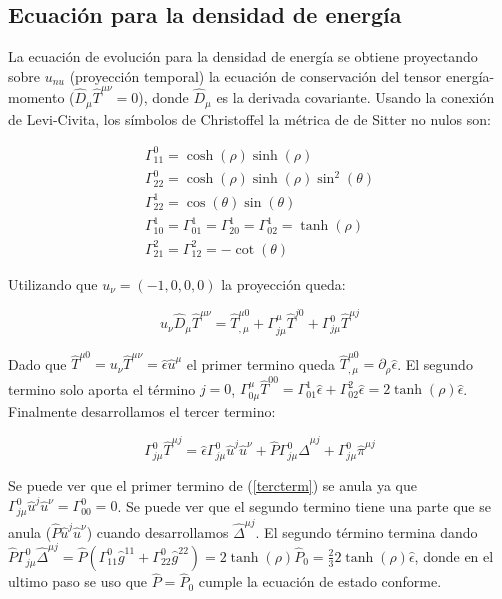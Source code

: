 \documentclass[11pt,a4paper]{article}
\begin{document}
\subsection{Ecuación para la densidad de energía}
La ecuación de evolución para la densidad de energía se obtiene proyectando sobre $u_{nu}$ (proyección temporal) la ecuación de conservación del tensor energía-momento ($\hat{D}_{\mu}\hat{T}^{{\mu}{\nu}}=0$), donde $\hat{D}_{\mu}$ es la derivada covariante.
Usando la conexión de Levi-Civita, los símbolos de Christoffel la métrica de de Sitter no nulos son:

\begin{subequations}
\begin{align}
\Gamma^{0}_{{1}{1}}=\cosh(\rho)\sinh(\rho)\\
\Gamma^{0}_{{2}{2}}=\cosh(\rho)\sinh(\rho)\sin^2(\theta)\\
\Gamma^{1}_{{2}{2}}=\cos(\theta)\sin(\theta)\\
\Gamma^{1}_{{1}{0}}=\Gamma^{1}_{{0}{1}}=\Gamma^{1}_{{2}{0}}=\Gamma^{1}_{{0}{2}}=\tanh(\rho)\\
\Gamma^{2}_{{2}{1}}=\Gamma^{2}_{{1}{2}}=-\cot(\theta)
\end{align}
\end{subequations}

Utilizando que $u_{\nu}=(-1,0,0,0)$ la proyección queda:

\begin{equation}
u_{\nu}\hat{D}_{\mu}\hat{T}^{{\mu}{\nu}}= \hat{T}^{{\mu}{0}}_{,\mu} +\Gamma^{\mu}_{{j}{\mu}}\hat{T}^{{j}{0}}+\Gamma^{0}_{{j}{\mu}}\hat{T}^{{\mu}{j}}
\end{equation}

Dado que $\hat{T}^{{\mu}{0}}=u_{\nu}\hat{T}^{{\mu}{\nu}}=\hat{\epsilon}\hat{u}^{\mu}$ el primer termino queda $\hat{T}^{{\mu}{0}}_{,\mu}={\partial}_{\rho}\hat{\epsilon}$. El segundo termino solo aporta el término $j=0$, $\Gamma^{\mu}_{{0}{\mu}}\hat{T}^{{0}{0}}=\Gamma^{1}_{{0}{1}}\hat{\epsilon}+\Gamma^{2}_{{0}{2}}\hat{\epsilon}=2\tanh(\rho)\hat{\epsilon}$.
Finalmente desarrollamos el tercer termino:

\begin{equation}
\Gamma^{0}_{{j}{\mu}}\hat{T}^{{\mu}{j}}=\hat{\epsilon}\Gamma^{0}_{{j}{\mu}}\hat{u}^{j}\hat{u}^{\nu}+\hat{P}\Gamma^{0}_{{j}{\mu}}\hat{\Delta}^{{\mu}{j}}+\Gamma^{0}_{{j}{\mu}}\hat{\pi}^{{\mu}{j}}
\label{tercterm}
\end{equation}

Se puede ver que el primer termino de (\ref{tercterm}) se anula ya que $\Gamma^{0}_{{j}{\mu}}\hat{u}^{j}\hat{u}^{\nu}=\Gamma^{0}_{{0}{0}}=0$. Se puede ver que el segundo termino tiene una parte que se anula ($\hat{P}\hat{u}^{j}\hat{u}^{\nu}$) cuando desarrollamos $\hat{\Delta}^{{\mu}{j}}$. El segundo término termina dando $\hat{P}\Gamma^{0}_{{j}{\mu}}\hat{\Delta}^{{\mu}{j}}=\hat{P}(\Gamma^{0}_{{1}{1}}\hat{g}^{{1}{1}}+\Gamma^{0}_{{2}{2}}\hat{g}^{{2}{2}})=2\tanh(\rho)\hat{P}_{0}=\frac{2}{3}2\tanh(\rho)\hat{\epsilon}$, donde en el ultimo paso se uso que $\hat{P}=\hat{P}_{0}$ cumple la ecuación de estado conforme.\\
\end{document}
